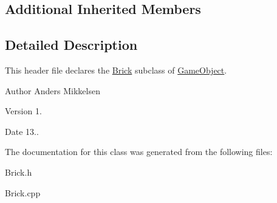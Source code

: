 \subsection*{Additional Inherited Members}


\subsection{Detailed Description}
This header file declares the \hyperlink{class_brick}{Brick} subclass of \hyperlink{class_game_object}{Game\+Object}. 

\begin{DoxyAuthor}{Author}
Anders Mikkelsen 
\end{DoxyAuthor}
\begin{DoxyVersion}{Version}
1. 
\end{DoxyVersion}
\begin{DoxyDate}{Date}
13.. 
\end{DoxyDate}


The documentation for this class was generated from the following files\+:\begin{DoxyCompactItemize}
\item 
Brick.\+h\item 
Brick.\+cpp\end{DoxyCompactItemize}
